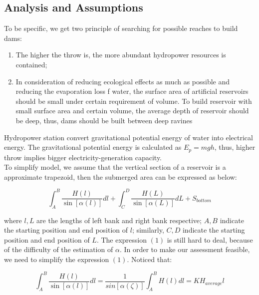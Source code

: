 \documentclass{mcmthesis}
\begin{document}
\subsection{Analysis and Assumptions}
\indent \indent To be specific, we get two principle of searching for possible reaches to build dams:
\begin{enumerate}
  \setlength{\itemsep}{0pt}
  \setlength{\parsep}{0pt}
  \setlength{\parskip}{0pt}
  \item The higher the throw is, the more abundant hydropower resources is contained;
  \item In consideration of reducing ecological effects as much as possible and reducing the evaporation loss f water, the surface area of artificial reservoirs should be small under certain requirement of volume. To build reservoir with small surface area and certain volume, the average depth of reservoir should be deep, thus, dams should be built between deep ravines
\end{enumerate}

\indent Hydropower station convert gravitational potential energy of water into electrical energy. The gravitational potential energy is calculated as $E_{p} = mgh$, thus, higher throw implies bigger electricity-generation capacity.\\

\indent To simplify model, we assume that the vertical section of a reservoir is a approximate trapezoid, then the submerged area can be expressed as below:

\begin{equation}\int_{A}^{B}\frac{H\left(l\right)}{\sin\left[\alpha\left(l\right)\right]}dl + \int_{C}^{D}\frac{H\left(L\right)}{\sin\left[\alpha\left(L\right)\right]}dL + S_{bottom}\end{equation}

where $l, L$ are the lengths of left bank and right bank respective; $A, B$ indicate the starting position and end position of $l$; similarly, $C, D$ indicate the starting position and end position of $L$.
The expression $\left(1\right)$ is still hard to deal, because of the difficulty of the estimation of $\alpha$. In order to make our assessment feasible, we need to simplify the expression $\left(1\right)$. Noticed that:

\begin{equation}
\int_{A}^{B}\frac{H\left(l\right)}{\sin\left[\alpha\left(l\right)\right]}dl = \frac{1}{sin\left[\alpha\left(\zeta\right)\right]}\int_{A}^{B}H\left(l\right)dl
= KH_{average}l
\end{equation}
\end{document}
